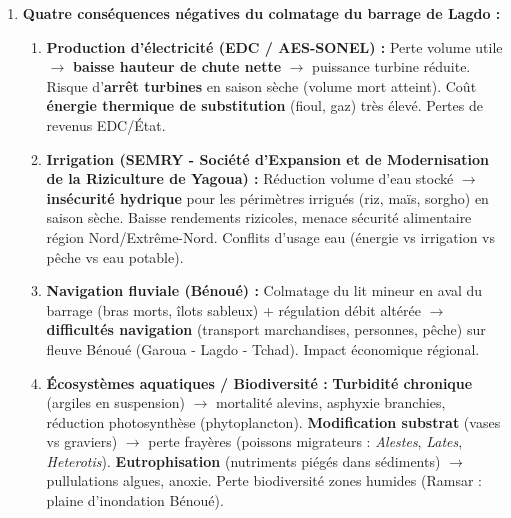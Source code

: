 \documentclass[11pt]{article}
\begin{document}
\begin{corrige}
\begin{enumerate}
    \item \textbf{Quatre conséquences négatives du colmatage du barrage de Lagdo :}
    \begin{enumerate}
        \item \textbf{Production d'électricité (EDC / AES-SONEL) :} Perte volume utile $\rightarrow$ \textbf{baisse hauteur de chute nette} $\rightarrow$ puissance turbine réduite. Risque d'\textbf{arrêt turbines} en saison sèche (volume mort atteint). Coût \textbf{énergie thermique de substitution} (fioul, gaz) très élevé. Pertes de revenus EDC/État.
        \item \textbf{Irrigation (SEMRY - Société d'Expansion et de Modernisation de la Riziculture de Yagoua) :} Réduction volume d'eau stocké $\rightarrow$ \textbf{insécurité hydrique} pour les périmètres irrigués (riz, maïs, sorgho) en saison sèche. Baisse rendements rizicoles, menace sécurité alimentaire région Nord/Extrême-Nord. Conflits d'usage eau (énergie vs irrigation vs pêche vs eau potable).
        \item \textbf{Navigation fluviale (Bénoué) :} Colmatage du lit mineur en aval du barrage (bras morts, îlots sableux) + régulation débit altérée $\rightarrow$ \textbf{difficultés navigation} (transport marchandises, personnes, pêche) sur fleuve Bénoué (Garoua - Lagdo - Tchad). Impact économique régional.
        \item \textbf{Écosystèmes aquatiques / Biodiversité :} \textbf{Turbidité chronique} (argiles en suspension) $\rightarrow$ mortalité alevins, asphyxie branchies, réduction photosynthèse (phytoplancton). \textbf{Modification substrat} (vases vs graviers) $\rightarrow$ perte frayères (poissons migrateurs : \textit{Alestes}, \textit{Lates}, \textit{Heterotis}). \textbf{Eutrophisation} (nutriments piégés dans sédiments) $\rightarrow$ pullulations algues, anoxie. Perte biodiversité zones humides (Ramsar : plaine d'inondation Bénoué).
    \end{enumerate}


\end{enumerate}
\end{corrige}
\end{document}
